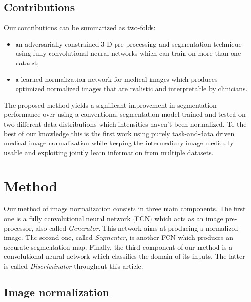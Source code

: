 \documentclass[preprint,12pt]{elsarticle}
\begin{document}
\subsection{Contributions}

Our contributions can be summarized as two-folds:
\begin{itemize}
    \item an adversarially-constrained 3-D pre-processing and segmentation technique using fully-convolutional neural networks which can train on more than one dataset;

    \item a learned normalization network for medical images which produces optimized normalized images that are realistic and interpretable by clinicians.
\end{itemize}

The proposed method yields a significant improvement in segmentation performance over using a conventional segmentation model trained and tested on two different data distributions which intensities haven’t been normalized. To the best of our knowledge this is the first work using purely task-and-data driven medical image normalization while keeping the intermediary image medically usable and exploiting jointly learn information from multiple datasets.

\section{Method}

Our method of image normalization consists in three main components. The first one is a fully convolutional neural network (FCN) which acts as an image pre-processor, also called \emph{Generator}. This network aims at producing a normalized image. The second one, called \emph{Segmenter}, is another FCN which produces an accurate segmentation map. Finally, the third component of our method is a convolutional neural network which classifies the domain of its inputs. The latter is called \emph{Discriminator} throughout this article.

\subsection{Image normalization}
\end{document}

